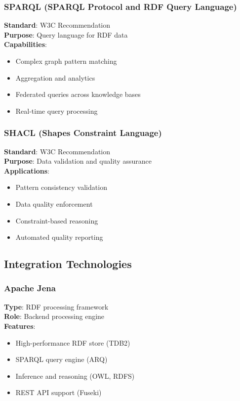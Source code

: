 \documentclass[12pt,a4paper]{article}
\begin{document}
\subsubsection{SPARQL (SPARQL Protocol and RDF Query Language)}
\textbf{Standard}: W3C Recommendation\\
\textbf{Purpose}: Query language for RDF data\\
\textbf{Capabilities}:
\begin{itemize}
    \item Complex graph pattern matching
    \item Aggregation and analytics
    \item Federated queries across knowledge bases
    \item Real-time query processing
\end{itemize}

\subsubsection{SHACL (Shapes Constraint Language)}
\textbf{Standard}: W3C Recommendation\\
\textbf{Purpose}: Data validation and quality assurance\\
\textbf{Applications}:
\begin{itemize}
    \item Pattern consistency validation
    \item Data quality enforcement
    \item Constraint-based reasoning
    \item Automated quality reporting
\end{itemize}

\subsection{Integration Technologies}

\subsubsection{Apache Jena}
\textbf{Type}: RDF processing framework\\
\textbf{Role}: Backend processing engine\\
\textbf{Features}:
\begin{itemize}
    \item High-performance RDF store (TDB2)
    \item SPARQL query engine (ARQ)
    \item Inference and reasoning (OWL, RDFS)
    \item REST API support (Fuseki)
\end{itemize}
\end{document}

